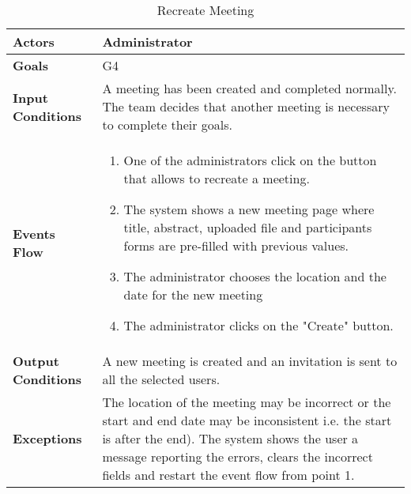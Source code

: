 \begin{table}[H]
	\centering
	\def\arraystretch{1.5}
	\begin{tabular}{|p{7cm}|p{7cm}|}
		\hline
		\textbf{Actors}            & Administrator    \\ \hline
		\textbf{Goals}             & G4           \\ \hline
		\textbf{Input Conditions}  & A meeting has been created and completed normally. The team decides that another meeting is necessary to complete their goals. \\ \hline
		\textbf{Events Flow}       & 
		\begin{enumerate}[topsep=0pt, leftmargin=*]
			\item One of the administrators click on the button that allows to recreate a meeting.
			\item The system shows a new meeting page where title, abstract, uploaded file and participants forms are pre-filled with previous values.
			\item The administrator chooses the location and the date for the new meeting
			\item The administrator clicks on the "Create" button.
		\end{enumerate}              \\ \hline
		\textbf{Output Conditions} & A new meeting is created and an invitation is sent to all the selected users.           \\ \hline
		\textbf{Exceptions}        & The location of the meeting may be incorrect or the start and end date may be inconsistent i.e. the start is after the end). The system shows the user a message reporting the errors,
		clears the incorrect fields and restart the event
		flow from point 1.           \\ \hline
	\end{tabular}
	\caption{Recreate Meeting}
\end{table}


